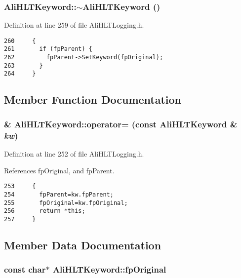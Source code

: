 \subsubsection{\setlength{\rightskip}{0pt plus 5cm}Ali\-HLTKeyword::$\sim${\bf Ali\-HLTKeyword} ()\hspace{0.3cm}{\tt  [inline]}}\label{classAliHLTKeyword_a4}




Definition at line 259 of file Ali\-HLTLogging.h.

\footnotesize\begin{verbatim}260     {
261       if (fpParent) {
262         fpParent->SetKeyword(fpOriginal);
263       }
264     }
\end{verbatim}\normalsize 




\subsection{Member Function Documentation}
\subsubsection{\& Ali\-HLTKeyword::operator= (const {\bf Ali\-HLTKeyword} \& {\em kw})\hspace{0.3cm}{\tt  [inline]}}\label{classAliHLTKeyword_a3}




Definition at line 252 of file Ali\-HLTLogging.h.

References fp\-Original, and fp\-Parent.

\footnotesize\begin{verbatim}253     { 
254       fpParent=kw.fpParent;
255       fpOriginal=kw.fpOriginal;
256       return *this;
257     }
\end{verbatim}\normalsize 




\subsection{Member Data Documentation}
\subsubsection{\setlength{\rightskip}{0pt plus 5cm}const char$\ast$ {\bf Ali\-HLTKeyword::fp\-Original}\hspace{0.3cm}{\tt  [private]}}\label{classAliHLTKeyword_r1}


